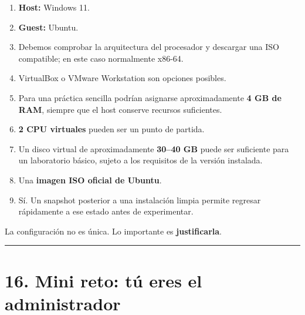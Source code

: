 \documentclass[
  spanish,
  letterpaper,
]{scrbook}
\providecommand{\tightlist}{%
  \setlength{\itemsep}{0pt}\setlength{\parskip}{0pt}}
\begin{document}
\begin{tcolorbox}[enhanced jigsaw, arc=.35mm, bottomrule=.15mm, bottomtitle=1mm, breakable, colback=white, colbacktitle=quarto-callout-tip-color!10!white, colframe=quarto-callout-tip-color-frame, coltitle=black, left=2mm, leftrule=.75mm, opacityback=0, opacitybacktitle=0.6, rightrule=.15mm, title=\textcolor{quarto-callout-tip-color}{\faLightbulb}\hspace{0.5em}{✅ Ver una posible solución}, titlerule=0mm, toprule=.15mm, toptitle=1mm]

\begin{enumerate}
\def\labelenumi{\arabic{enumi}.}
\tightlist
\item
  \textbf{Host:} Windows 11.
\item
  \textbf{Guest:} Ubuntu.
\item
  Debemos comprobar la arquitectura del procesador y descargar una ISO
  compatible; en este caso normalmente x86-64.
\item
  VirtualBox o VMware Workstation son opciones posibles.
\item
  Para una práctica sencilla podrían asignarse aproximadamente \textbf{4
  GB de RAM}, siempre que el host conserve recursos suficientes.
\item
  \textbf{2 CPU virtuales} pueden ser un punto de partida.
\item
  Un disco virtual de aproximadamente \textbf{30--40 GB} puede ser
  suficiente para un laboratorio básico, sujeto a los requisitos de la
  versión instalada.
\item
  Una \textbf{imagen ISO oficial de Ubuntu}.
\item
  Sí. Un snapshot posterior a una instalación limpia permite regresar
  rápidamente a ese estado antes de experimentar.
\end{enumerate}

La configuración no es única. Lo importante es \textbf{justificarla}.

\end{tcolorbox}

\begin{center}\rule{0.5\linewidth}{0.5pt}\end{center}


\chapter{16. Mini reto: tú eres el
administrador}\label{mini-reto-tuxfa-eres-el-administrador}
\end{document}
